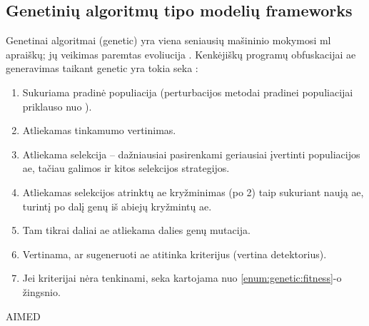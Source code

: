 \subsection{Genetinių algoritmų tipo modelių \glspl{framework}}\label{sec:literature:genetic}

Genetinai algoritmai (\gls{genetic}) yra viena seniausių mašininio mokymosi
\gls{ml} apraiškų; jų veikimas paremtas evoliucija
\cite{castroAIMEDEvolvingMalware2019}. Kenkėjiškų programų obfuskacijai
\gls{ae} generavimas taikant \gls{genetic} yra tokia seka
\cite{yusteOptimizationCodeCaves2022}:
\begin{enumerate}
    \item Sukuriama pradinė populiacija (perturbacijos metodai pradinei populiacijai
          priklauso nuo ).
    \item Atliekamas tinkamumo  vertinimas.\label{enum:genetic:fitness}
    \item Atliekama selekcija -- dažniausiai pasirenkami geriausiai įvertinti
          populiacijos \gls{ae}, tačiau galimos ir kitos selekcijos strategijos.
    \item Atliekamas selekcijos atrinktų \gls{ae} kryžminimas (po 2) taip sukuriant naują
          \gls{ae}, turintį po dalį genų iš abiejų kryžmintų \gls{ae}.
    \item Tam tikrai daliai \gls{ae} atliekama dalies genų mutacija.
    \item Vertinama, ar sugeneruoti \gls{ae} atitinka kriterijus (vertina detektorius).
    \item Jei kriterijai nėra tenkinami, seka kartojama nuo \ref{enum:genetic:fitness}-o
          žingsnio.
\end{enumerate}

\begin{describeFramework}{AIMED}{\cite{castroAIMEDEvolvingMalware2019}}
\end{describeFramework}

